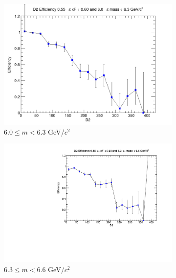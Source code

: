 \begin{figure}[p]
\begin{subfigure}[b]{0.32\textwidth}
        \includegraphics[width=\textwidth]{./kTrackerEfficiencyPlots/D2_Efficiency_xF11_mass6.png}
        \caption{$6.0 \leq m < 6.3$ GeV/$c^2$}
        \label{fig:xF11_mass6}
    \end{subfigure}
    \hfill
    \begin{subfigure}[b]{0.32\textwidth}
        \centering
        \includegraphics[width=\textwidth]{./kTrackerEfficiencyPlots/D2_Efficiency_xF11_mass7.pdf}
        \caption{$6.3 \leq m < 6.6$ GeV/$c^2$}
        \label{fig:xF11_mass7}
    \end{subfigure}
    \hfill
    \begin{subfigure}[b]{0.32\textwidth}
        \centering

\end{subfigure}
\end{figure}
